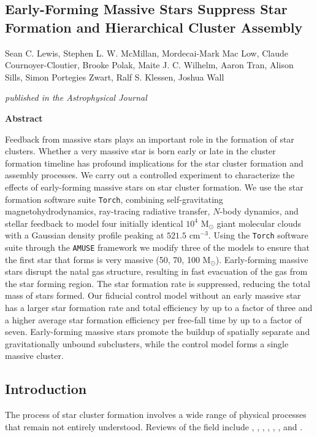 \documentclass[twoside]{drexel-thesis}
\begin{document}
\begin{thesis}
\chapter[Early-Forming Massive Stars]{Early-Forming Massive Stars Suppress Star Formation and Hierarchical Cluster Assembly}
\label{chp:Paper1}
Sean C. Lewis, Stephen L. W. McMillan, Mordecai-Mark Mac Low, Claude Cournoyer-Cloutier, Brooke Polak, Maite J. C. Wilhelm, Aaron Tran, Alison Sills, Simon Portegies Zwart, Ralf S. Klessen, Joshua Wall

\emph{published in the Astrophysical Journal}

\centerline{\textbf{Abstract}}

Feedback from massive stars plays an important role in the formation of star clusters. Whether a very massive star is born early or late in the cluster formation timeline has profound implications for the star cluster formation and assembly processes. We carry out a controlled experiment to characterize the effects of early-forming massive stars on star cluster formation. We use the star formation software suite \texttt{Torch}, combining self-gravitating magnetohydrodynamics, ray-tracing radiative transfer, $N$-body dynamics, and stellar feedback to model four initially identical $10^4$ M$_\odot$ giant molecular clouds with a Gaussian density profile peaking at $521.5 \mbox{ cm}^{-3}$. Using the \texttt{Torch} software suite through the \texttt{AMUSE} framework we modify three of the models to ensure that the first star that forms is very massive (50, 70, 100 M$_\odot$).
Early-forming massive stars disrupt the natal gas structure, resulting in fast evacuation of the gas from the star forming region. The star formation rate is suppressed, reducing the total mass of stars formed.  Our fiducial control model without an early massive star has a larger star formation rate and total efficiency by up to a factor of three and a higher average star formation efficiency per free-fall time by up to a factor of seven.
Early-forming massive stars promote the buildup of spatially separate and gravitationally unbound subclusters, while the control model forms a single massive cluster. 


\section{Introduction}
\label{sec:p1-intro}
The process of star cluster formation involves a wide range of physical processes that remain not entirely understood. Reviews of the field include \citet{mac_low_control_2004}, \citet{mckee_theory_2007}, \citet{portegies_zwart_young_2010}, \citet{klessen_physical_2016}, \citet{krumholz_star_2019}, \citet{girichidis_physical_2020}, and \citet{krause_physics_2020}. 


\end{thesis}
\end{document}
